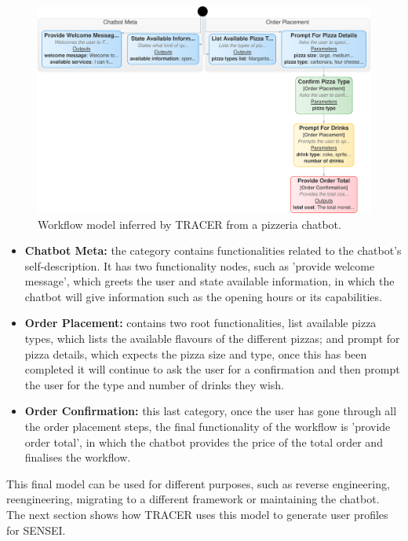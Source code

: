 \begin{figure}[!htb]
  \centering
  \includegraphics[width=\linewidth]{figures/workflow_graph-crop-back.pdf}
  \caption{
    Workflow model inferred by \ac{TRACER} from a pizzeria chatbot.
  }
  \label{fig:pizzeria-workflow}
\end{figure}

\begin{itemize}
  \item \textbf{Chatbot Meta:}
    the category contains functionalities related to the chatbot's self-description.
    It has two functionality nodes,
    such as 'provide welcome message',
    which greets the user
    and state available information,
    in which the chatbot will give information such as
    the opening hours or its capabilities.

  \item \textbf{Order Placement:}
    contains two root functionalities,
    list available pizza types,
    which lists the available flavours of the different pizzas;
    and prompt for pizza details,
    which expects the pizza size and type,
    once this has been completed
    it will continue to ask the user for a confirmation
    and then prompt the user for the type and number of drinks they wish.

  \item \textbf{Order Confirmation:}
    this last category,
    once the user has gone through all the order placement steps,
    the final functionality of the workflow is 'provide order total',
    in which the chatbot provides
    the price of the total order and finalises the workflow.
\end{itemize}

This final model can be used for different purposes,
such as reverse engineering, reengineering,
migrating to a different framework
or maintaining the chatbot.
The next section shows how \ac{TRACER} uses this model
to generate user profiles for SENSEI.

